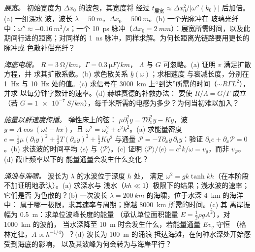 \begin{exercise}[$\star\star$]\label{exo:b2:dispersion-wave-packets:8}
\emph{展宽。} 初始宽度为 $\Delta x_0$ 的波包，其宽度将
经过 $t_{\text{展宽}} \approx \Delta x_0^2/|\omega''(k_0)|$ 后加倍。(a) 一组深水
波，波长 $\lambda = \qty{50}{m}$，$\Delta x_0 = \qty{500}{m}$。(b) 一个光脉冲在
玻璃光纤中：$\omega'' \approx \qty{-0.16}{m^2/s}$；一个 \qty{10}{ps} 脉冲（$\Delta x_0 =
\qty{2}{mm}$）：展宽所需时间，以及此期间行进的距离；对同样的
\qty{1}{ns} 脉冲，同样求解。为何长距离光链路要用更长的脉冲或
色散补偿光纤？
\end{exercise}

\begin{exercise}[$\star\star$]\label{exo:b2:dispersion-wave-packets:9}
\emph{海底电缆。} $R = \qty{3}{\ohm/km}$，$\Gamma = \qty{0.3}{\micro F/km}$，
$\Lambda$ 与 $G$ 可忽略。(a) 证明 $v$ 满足扩散方程，并
求其扩散系数。(b) 求色散关系 $\underline k(\omega)$；求相速度
与衰减长度，分别在 \qty{1}{Hz} 与 \qty{10}{Hz} 处的值。(c)
求信号在 \qty{3000}{km} 上“到达”所需的时间（$\sim R\Gamma L^2$），并求
以每分钟字数计的速率。(d) 赫维赛德的补救办法：
要使 $R/\Lambda = G/\Gamma$ 成立（若 $G = \qty{1e-7}{S/km}$），每千米所需的电感为多少？为何当初难以加入？
\end{exercise}

\begin{exercise}[$\star\star\star$]\label{exo:b2:dispersion-wave-packets:10}
\emph{能量以群速度传播。} 弹性床上的弦：
$\mu\partial_t^2y = T\partial_x^2y - Ky$，波 $y = A\cos(\omega t - kx)$，且 $\omega^2 =
\omega_c^2 + c^2k^2$。(a) 求能量密度 $e = \tfrac12\mu(\partial_ty)^2 + \tfrac12T
(\partial_xy)^2 + \tfrac12Ky^2$ 与通量 $\mathcal P = -T\partial_xy\,\partial_ty$：验证
$\partial_te + \partial_x\mathcal P = 0$。(b) 求该波的时间平均 $\langle e\rangle$ 与
$\langle\mathcal P\rangle$。(c) 证明 $\langle\mathcal P\rangle/
\langle e\rangle = c^2k/\omega = v_g$，而非 $v_\varphi$。(d) 截止频率以下的
能量通量会发生什么变化？
\end{exercise}

\begin{exercise}[$\star\star\star$]\label{exo:b2:dispersion-wave-packets:11}
\emph{涌浪与海啸。} 波长为 $\lambda$ 的水波位于深度 $h$ 处，
满足 $\omega^2 = gk\tanh kh$（在本阶段不加证明地承认）。(a) 求深水与
浅水（$kh \ll 1$）极限下的结果；浅水波的速率；它们是否
为色散的？(b) 一次波长 $\lambda = \qty{200}{km}$ 的海啸，位于水深 \qty{4}{km} 的海洋中：
属于哪一极限，求其速率与周期；穿越 \qty{8000}{km} 所需的时间。(c) 其
离岸振幅为 \qty{0.5}{m}：求单位波峰长度的能量
（承认单位面积能量 $E = \tfrac12\rho gA^2$），对 \qty{1000}{km} 的波前，
当水深降至 \qty{10}{m} 时会发生什么，若能量通量 $Ev_g$ 守恒
（格林定律，$A \propto h^{-1/4}$）？(d) 波长为 \qty{100}{m} 的涌浪
抵达海滩，在何种水深处开始感受到海底的影响，
以及其波峰为何会转为与海岸平行？
\end{exercise}

